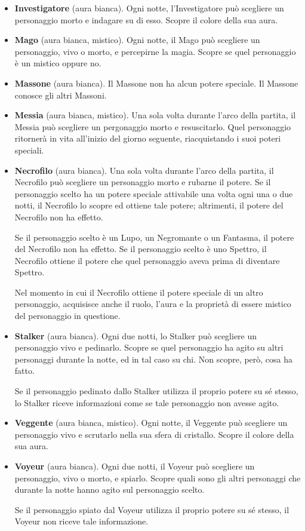 \documentclass[a4paper,10pt]{article}
\begin{document}
\begin{itemize}
 \item {\bf Investigatore} (aura bianca). Ogni notte, l'Investigatore può scegliere un personaggio morto e indagare su di esso. Scopre il colore della sua aura.

 \item {\bf Mago} (aura bianca, mistico). Ogni notte, il Mago può scegliere un personaggio, vivo o morto, e percepirne la magia. Scopre se quel personaggio è un mistico oppure no.
 
 \item {\bf Massone} (aura bianca). Il Massone non ha alcun potere speciale. Il Massone conosce gli altri Massoni.
 
 \item {\bf Messia} (aura bianca, mistico). Una sola volta durante l'arco della partita, il Messia può scegliere un pergonaggio morto e resuscitarlo. Quel personaggio ritornerà in vita all'inizio del giorno seguente, riacquistando i suoi poteri speciali.

 \item {\bf Necrofilo} (aura bianca). Una sola volta durante l'arco della partita, il Necrofilo può scegliere un personaggio morto e rubarne il potere. 
 Se il personaggio scelto ha un potere speciale attivabile una volta ogni una o due notti, il Necrofilo lo scopre ed ottiene tale potere; altrimenti, il potere del Necrofilo non ha effetto.
 
 Se il personaggio scelto è un Lupo, un Negromante o un Fantasma, il potere del Necrofilo non ha effetto.
 Se il personaggio scelto è uno Spettro, il Necrofilo ottiene il potere che quel personaggio aveva prima di diventare Spettro.
 
 Nel momento in cui il Necrofilo ottiene il potere speciale di un altro personaggio, acquisisce anche il ruolo, l'aura e la proprietà di essere mistico del personaggio in questione.

 \item {\bf Stalker} (aura bianca). Ogni due notti, lo Stalker può scegliere un personaggio vivo e pedinarlo. Scopre se quel personaggio ha agito su altri personaggi durante la notte, ed in tal caso su chi. Non scopre, però, cosa ha fatto.
 
 Se il personaggio pedinato dallo Stalker utilizza il proprio potere su sé stesso, lo Stalker riceve informazioni come se tale personaggio non avesse agito.
 
 \item {\bf Veggente} (aura bianca, mistico). Ogni notte, il Veggente può scegliere un personaggio vivo e scrutarlo nella sua sfera di cristallo. Scopre il colore della sua aura.

 \item {\bf Voyeur} (aura bianca). Ogni due notti, il Voyeur può scegliere un personaggio, vivo o morto, e spiarlo. Scopre quali sono gli altri personaggi che durante la notte hanno agito sul personaggio scelto.
 
 Se il personaggio spiato dal Voyeur utilizza il proprio potere su sé stesso, il Voyeur non riceve tale informazione.

\end{itemize}
\end{document}

